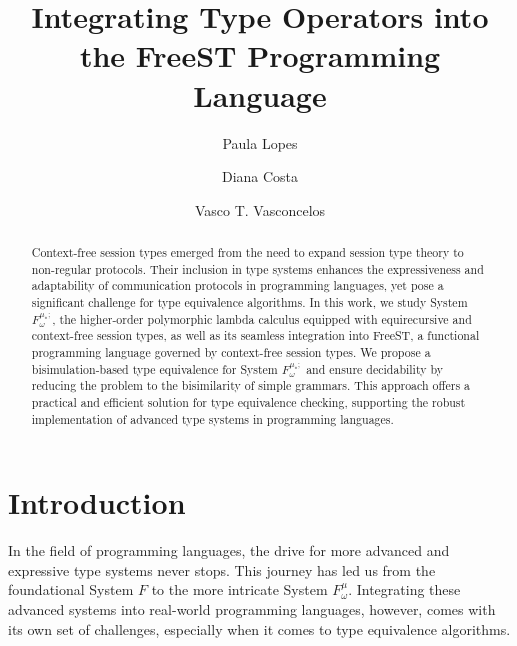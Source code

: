 \documentclass[runningheads,dvipsnames]{llncs}
\begin{document}
%
\title{Integrating Type Operators into the FreeST Programming Language}
%
%
\author{Paula Lopes \and
Diana Costa \and
Vasco T. Vasconcelos}

%
%
%
\maketitle              %
%
\begin{abstract}
Context-free session types emerged from the need to expand session type theory to non-regular protocols. Their inclusion in type systems enhances the expressiveness and adaptability of communication protocols in programming languages, yet pose a significant challenge for type equivalence algorithms. In this work, we study System $F^{\mu_*;}_\omega$, the higher-order polymorphic lambda calculus equipped with equirecursive and context-free session types, as well as its seamless integration into FreeST, a functional programming language governed by context-free session types.
We propose a bisimulation-based type equivalence for System $F^{\mu_*;}_\omega$ and ensure decidability by reducing the problem to the bisimilarity of simple grammars. This approach offers a practical and efficient solution for type equivalence checking, supporting the robust implementation of advanced type systems in programming languages.

\end{abstract}

\section{Introduction}
In the field of programming languages, the drive for more advanced and expressive type systems never stops. This journey has led us from the foundational System $F$\cite{DBLP:conf/programm/Reynolds74} to the more intricate System $F^{\mu}_\omega$\cite{DBLP:conf/popl/CaiGO16}. Integrating these advanced systems into real-world programming languages, however, comes with its own set of challenges, especially when it comes to type equivalence algorithms.
\end{document}

